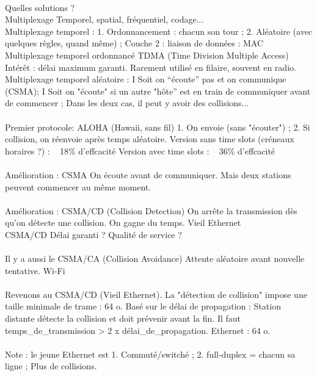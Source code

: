 \documentclass[5pt]{article}
\begin{document}
\begin{scriptsize}
\\
Quelles solutions ?\\
Multiplexage Temporel, spatial, fréquentiel, codage...\\
Multiplexage temporel : 1. Ordonnancement : chacun son tour ; 2. Aléatoire (avec quelques règles, quand même) ;
Couche 2 : liaison de données : MAC
Multiplexage temporel ordonnancé TDMA (Time Division Multiple Access) Intérêt : délai maximum garanti. Rarement utilisé en filaire, souvent en radio.\\
Multiplexage temporel aléatoire : I Soit on “écoute” pas et on communique (CSMA); I Soit on "écoute" si un autre "hôte” est en train de communiquer avant de commencer ; Dans les deux cas, il peut y avoir des collisions...\\
\\
Premier protocole: ALOHA (Hawaii, sans fil) 1. On envoie (sans "écouter") ; 2. Si collision, on réenvoie après temps aléatoire. Version sans time slots (créneaux horaires ?) : ~ 18\% d'effcacité Version avec time slots : ~ 36\% d'effcacité\\
\\
Amélioration : CSMA On écoute avant de communiquer. Mais deux stations peuvent commencer au même moment.\\
\\
Amélioration : CSMA/CD (Collision Detection) On arrête la transmission dès qu’on détecte une collision. On gagne du temps. Vieil Ethernet\\
CSMA/CD Délai garanti ? Qualité de service ?\\
\\
Il y a aussi le CSMA/CA (Collision Avoidance) Attente aléatoire avant nouvelle tentative. Wi-Fi\\
\\
Revenons au CSMA/CD (Vieil Ethernet). La "détection de collision" impose une taille minimale de trame : 64 o. Basé sur le délai de propagation : Station distante détecte la collision et doit prévenir avant la fin. Il faut temps\_de\_transmission > 2 x délai\_de\_propagation. Ethernet : 64 o.\\
\\
Note : le jeune Ethernet est 1. Commuté/switché ; 2. full-duplex = chacun sa ligne ; Plus de collisions.\\


\end{scriptsize}
\end{document}
